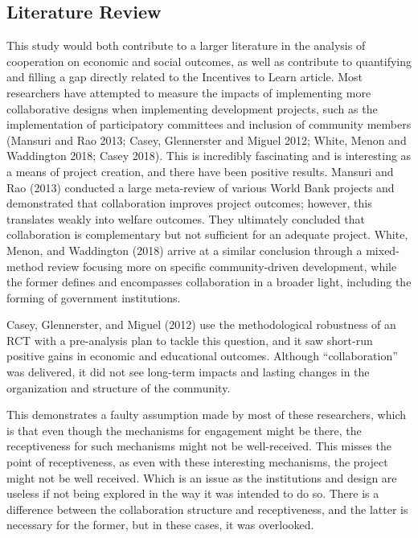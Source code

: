 \documentclass{article}
\begin{document}
\subsection{Literature Review}
This study would both contribute to a larger literature in the analysis of cooperation on economic and social outcomes, as well as contribute to quantifying and filling a gap directly related to the Incentives to Learn article. Most researchers have attempted to measure the impacts of implementing more collaborative designs when implementing development projects, such as the implementation of participatory committees and inclusion of community members (Mansuri and Rao 2013; Casey, Glennerster and Miguel 2012; White, Menon and Waddington 2018; Casey 2018).\autocites{mansuri-rao-2013}{casey-glennerster-miguel-2012}{white-menon-waddington-2018}{casey-2018-annrev} This is incredibly fascinating and is interesting as a means of project creation, and there have been positive results. Mansuri and Rao (2013) conducted a large meta-review of various World Bank projects and demonstrated that collaboration improves project outcomes; however, this translates weakly into welfare outcomes.\autocite[see esp.~ch.~2]{mansuri-rao-2013} They ultimately concluded that collaboration is complementary but not sufficient for an adequate project. White, Menon, and Waddington (2018) arrive at a similar conclusion through a mixed-method review focusing more on specific community-driven development, while the former defines and encompasses collaboration in a broader light, including the forming of government institutions. \autocite[]{white-menon-waddington-2018} 

Casey, Glennerster, and Miguel (2012) use the methodological robustness of an RCT with a pre-analysis plan to tackle this question, and it saw short-run positive gains in economic and educational outcomes.\autocite[]{casey-glennerster-miguel-2012} Although “collaboration” was delivered, it did not see long-term impacts and lasting changes in the organization and structure of the community. 
	
This demonstrates a faulty assumption made by most of these researchers, which is that even though the mechanisms for engagement might be there, the receptiveness for such mechanisms might not be well-received. This misses the point of receptiveness, as even with these interesting mechanisms, the project might not be well received. Which is an issue as the institutions and design are useless if not being explored in the way it was intended to do so. There is a difference between the collaboration structure and receptiveness, and the latter is necessary for the former, but in these cases, it was overlooked. 
\end{document}
